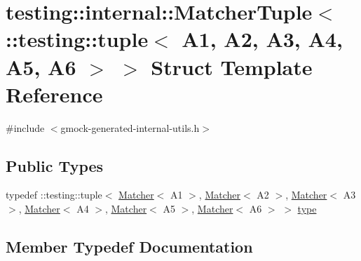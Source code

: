 \hypertarget{structtesting_1_1internal_1_1MatcherTuple_3_01_1_1testing_1_1tuple_3_01A1_00_01A2_00_01A3_00_01A4_00_01A5_00_01A6_01_4_01_4}{}\section{testing\+::internal\+::Matcher\+Tuple$<$ \+::testing\+::tuple$<$ A1, A2, A3, A4, A5, A6 $>$ $>$ Struct Template Reference}
\label{structtesting_1_1internal_1_1MatcherTuple_3_01_1_1testing_1_1tuple_3_01A1_00_01A2_00_01A3_00_01A4_00_01A5_00_01A6_01_4_01_4}


{\ttfamily \#include $<$gmock-\/generated-\/internal-\/utils.\+h$>$}

\subsection*{Public Types}
\begin{DoxyCompactItemize}
\item 
typedef \+::testing\+::tuple$<$ \mbox{\hyperlink{classtesting_1_1Matcher}{Matcher}}$<$ A1 $>$, \mbox{\hyperlink{classtesting_1_1Matcher}{Matcher}}$<$ A2 $>$, \mbox{\hyperlink{classtesting_1_1Matcher}{Matcher}}$<$ A3 $>$, \mbox{\hyperlink{classtesting_1_1Matcher}{Matcher}}$<$ A4 $>$, \mbox{\hyperlink{classtesting_1_1Matcher}{Matcher}}$<$ A5 $>$, \mbox{\hyperlink{classtesting_1_1Matcher}{Matcher}}$<$ A6 $>$ $>$ \mbox{\hyperlink{structtesting_1_1internal_1_1MatcherTuple_3_01_1_1testing_1_1tuple_3_01A1_00_01A2_00_01A3_00_01A4_00_01A5_00_01A6_01_4_01_4_ab153a3308ca82444de060ff9f0c56f8a}{type}}
\end{DoxyCompactItemize}


\subsection{Member Typedef Documentation}
\mbox{\label{structtesting_1_1internal_1_1MatcherTuple_3_01_1_1testing_1_1tuple_3_01A1_00_01A2_00_01A3_00_01A4_00_01A5_00_01A6_01_4_01_4_ab153a3308ca82444de060ff9f0c56f8a}} 

